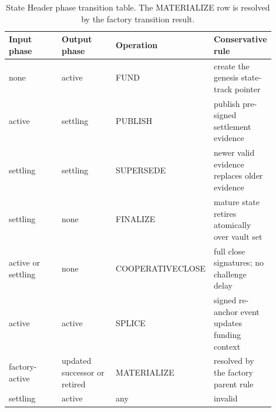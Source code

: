 \documentclass[a4paper,11pt]{article}
\begin{document}
\begin{table}[H]
\centering
\small
\setlength{\tabcolsep}{4pt}
\begin{tabular}{L{0.22\linewidth}L{0.22\linewidth}L{0.24\linewidth}L{0.22\linewidth}}
\toprule
Input phase & Output phase & Operation & Conservative rule \\
\midrule
none & active & \textsf{FUND} & create the genesis state-track pointer \\
active & settling & \textsf{PUBLISH} & publish pre-signed settlement evidence \\
settling & settling & \textsf{SUPERSEDE} & newer valid evidence replaces older evidence \\
settling & none & \textsf{FINALIZE} & mature state retires atomically over vault set \\
active or settling & none & \textsf{COOPERATIVE}\newline\textsf{CLOSE} & full close signatures; no challenge delay \\
active & active & \textsf{SPLICE} & signed re-anchor event updates funding context \\
factory-active & updated successor or retired & \textsf{MATERIALIZE} & resolved by the factory parent rule \\
settling & active & any & invalid \\
\bottomrule
\end{tabular}
\caption{State Header phase transition table. The \textsf{MATERIALIZE} row is resolved by the factory transition result.}
\label{tab:phase-transition}
\end{table}
\end{document}

